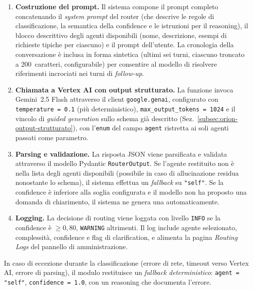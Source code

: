 \begin{enumerate}
  \item \textbf{Costruzione del prompt.} Il sistema compone il prompt completo
  concatenando il \emph{system prompt} del router (che descrive le regole di classificazione,
  la semantica della confidence e le istruzioni per il reasoning),
  il blocco descrittivo degli agenti disponibili (nome, descrizione, esempi di richieste tipiche per ciascuno)
  e il prompt dell'utente. La cronologia della conversazione è inclusa in forma sintetica
  (ultimi sei turni, ciascuno troncato a 200~caratteri, configurabile) per consentire al modello di risolvere
  riferimenti incrociati nei turni di \emph{follow-up}.

  \item \textbf{Chiamata a Vertex AI con output strutturato.} La funzione invoca Gemini~2.5 Flash
  attraverso il client \texttt{google.genai}, configurato con \texttt{temperature = 0.1} (più deterministico),
  \texttt{max\_output\_tokens = 1024} e il vincolo di \emph{guided generation} sullo schema
  già descritto (Sez.~\ref{subsec:orion-output-strutturato}), con l'\texttt{enum} del campo
  \texttt{agent} ristretta ai soli agenti passati come parametro.

  \item \textbf{Parsing e validazione.} La risposta JSON viene parsificata e
  validata attraverso il modello Pydantic \texttt{RouterOutput}.
  Se l'agente restituito non è nella lista degli agenti disponibili (possibile in caso di allucinazione residua nonostante lo schema),
  il sistema effettua un \emph{fallback} su \texttt{"self"}. Se la confidence è inferiore alla soglia configurata e il modello non ha proposto una domanda di chiarimento,
  il sistema ne genera una automaticamente.

  \item \textbf{Logging.} La decisione di routing viene loggata con livello \texttt{INFO}
  se la confidence è $\geq 0{,}80$, \texttt{WARNING} altrimenti. Il log include agente selezionato, complessità,
  confidence e flag di clarification, e alimenta la pagina \emph{Routing Logs} del pannello di amministrazione.
\end{enumerate}

In caso di eccezione durante la classificazione (errore di rete, timeout verso Vertex AI, errore di parsing),
il modulo restituisce un \emph{fallback deterministico}: \texttt{agent = "self"}, \texttt{confidence = 1.0},
con un reasoning che documenta l'errore.

